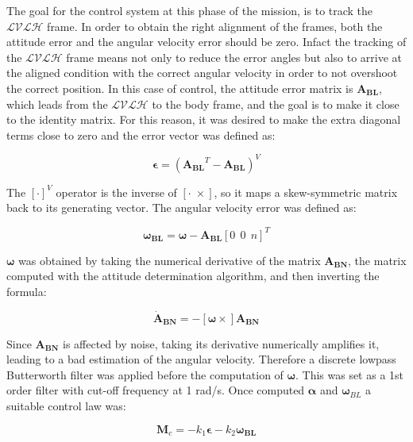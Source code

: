 The goal for the control system at this phase of the mission, is to track the $\mathcal{LVLH}$ frame. In order to obtain the right alignment of the frames, both the attitude error and the angular velocity error should be zero. Infact the tracking of the $\mathcal{LVLH}$ frame means not only to reduce the error angles but also to arrive at the aligned condition with the correct angular velocity in order to not overshoot the correct position. In this case of control, the attitude error matrix is $\boldsymbol{A_{BL}}$, which leads from the $\mathcal{LVLH}$ to the body frame, and the goal is to make it close to the identity matrix. For this reason, it was desired to make the extra diagonal terms close to zero and the error vector was defined as:

\begin{equation}
    \boldsymbol{\epsilon}=(\boldsymbol{A_{BL}}^T- \boldsymbol{A_{BL}})^V
\end{equation}

The $[\cdot]^V$ operator is the inverse of $[\cdot \; \times]$, so it maps a skew-symmetric matrix back to its generating vector. 
The angular velocity error was defined as:

\begin{equation}
    \boldsymbol{\omega_{BL}}=\boldsymbol{\omega}-\boldsymbol{A_{BL}}[0 \ \ 0 \ \ n]^T
\end{equation}

$\boldsymbol{\omega}$ was obtained by taking the numerical derivative of the matrix $\boldsymbol{A_{BN}}$, the matrix computed with the attitude determination algorithm, and then inverting the formula:

\begin{equation}
    \boldsymbol{\dot{A}_{BN}} = -[\boldsymbol{\omega} \times] \boldsymbol{A_{BN}}
\end{equation}

Since $\boldsymbol{A_{BN}}$ is affected by noise, taking its derivative numerically amplifies it, leading to a bad estimation of the angular velocity. Therefore a discrete lowpass Butterworth filter was applied before the computation of $\boldsymbol{\omega}$. This was set as a 1st order filter with cut-off frequency at 1 rad/s. Once computed $\boldsymbol{\alpha}$ and $\boldsymbol{\omega}_{BL}$ a suitable control law was:

\begin{equation}
    \boldsymbol{M}_c=-k_1\boldsymbol{\epsilon}-k_2\boldsymbol{{\omega}_{BL}}
\end{equation}

